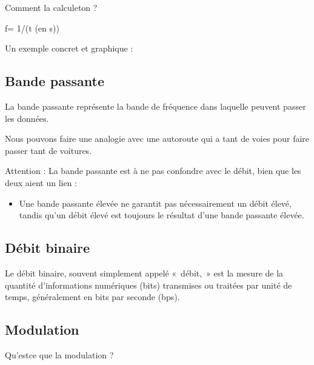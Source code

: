 \documentclass[letterpaper,10pt,french]{sphinxmanual}
\begin{document}
\sphinxAtStartPar
Comment la calcule\sphinxhyphen{}t\sphinxhyphen{}on ?

\sphinxAtStartPar
f=  1/(t (en s))

\sphinxAtStartPar
Un exemple concret et graphique :



\subsection{Bande passante}
\label{\detokenize{Documentation-M144:bande-passante}}
\sphinxAtStartPar
La bande passante représente la bande de fréquence dans laquelle peuvent passer les données.

\sphinxAtStartPar
Nous pouvons faire une analogie avec une autoroute qui a tant de voies pour faire passer tant de voitures.

\sphinxAtStartPar
Attention : La bande passante est à ne pas confondre avec le débit, bien que les deux aient un lien :
\begin{itemize}
\item {} 
\sphinxAtStartPar
Une bande passante élevée ne garantit pas nécessairement un débit élevé, tandis qu’un débit élevé est toujours le résultat d’une bande passante élevée.

\end{itemize}


\subsection{Débit binaire}
\label{\detokenize{Documentation-M144:debit-binaire}}
\sphinxAtStartPar
Le débit binaire, souvent simplement appelé « débit, » est la mesure de la quantité d’informations numériques (bits) transmises ou traitées par unité de temps, généralement en bits par seconde (bps).



\subsection{Modulation}
\label{\detokenize{Documentation-M144:modulation}}
\sphinxAtStartPar
Qu’est\sphinxhyphen{}ce que la modulation ?
\end{document}
